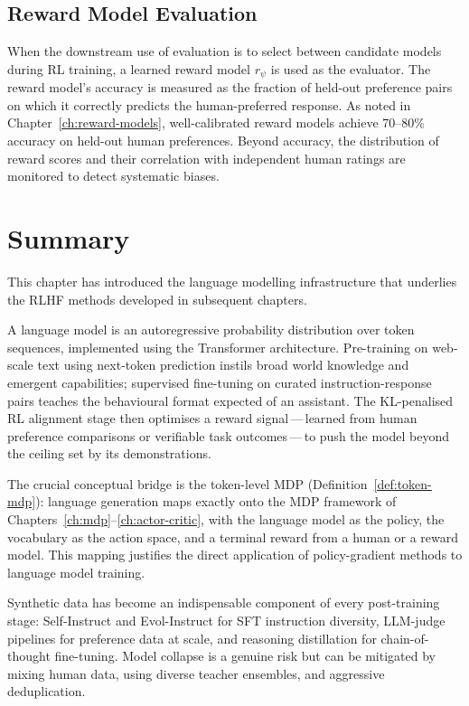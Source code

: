 \subsection{Reward Model Evaluation}

When the downstream use of evaluation is to select between candidate models during RL training, a learned reward model $r_\psi$ is used as the evaluator. The reward model's accuracy is measured as the fraction of held-out preference pairs on which it correctly predicts the human-preferred response. As noted in Chapter~\ref{ch:reward-models}, well-calibrated reward models achieve 70--80\% accuracy on held-out human preferences. Beyond accuracy, the distribution of reward scores and their correlation with independent human ratings are monitored to detect systematic biases.

\section{Summary}
\label{sec:lm-summary}

This chapter has introduced the language modelling infrastructure that underlies the RLHF methods developed in subsequent chapters.

A language model is an autoregressive probability distribution over token sequences, implemented using the Transformer architecture. Pre-training on web-scale text using next-token prediction instils broad world knowledge and emergent capabilities; supervised fine-tuning on curated instruction-response pairs teaches the behavioural format expected of an assistant. The KL-penalised RL alignment stage then optimises a reward signal\,---\,learned from human preference comparisons or verifiable task outcomes\,---\,to push the model beyond the ceiling set by its demonstrations.

The crucial conceptual bridge is the token-level MDP (Definition~\ref{def:token-mdp}): language generation maps exactly onto the MDP framework of Chapters~\ref{ch:mdp}--\ref{ch:actor-critic}, with the language model as the policy, the vocabulary as the action space, and a terminal reward from a human or a reward model. This mapping justifies the direct application of policy-gradient methods to language model training.

Synthetic data has become an indispensable component of every post-training stage: Self-Instruct and Evol-Instruct for SFT instruction diversity, LLM-judge pipelines for preference data at scale, and reasoning distillation for chain-of-thought fine-tuning. Model collapse is a genuine risk but can be mitigated by mixing human data, using diverse teacher ensembles, and aggressive deduplication.

